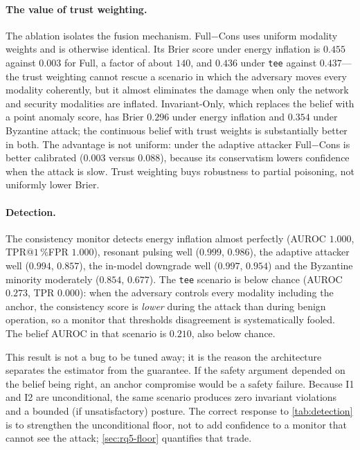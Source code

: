 \paragraph{The value of trust weighting.} The ablation isolates the fusion
mechanism. Full$-$Cons uses uniform modality weights and is otherwise identical.
Its Brier score under energy inflation is $0.455$ against $0.003$ for Full, a
factor of about $140$, and $0.436$ under \texttt{tee} against $0.437$---the trust
weighting cannot rescue a scenario in which the adversary moves every modality
coherently, but it almost eliminates the damage when only the network and
security modalities are inflated. Invariant-Only, which replaces the belief with a
point anomaly score, has Brier $0.296$ under energy inflation and $0.354$ under
Byzantine attack; the continuous belief with trust weights is substantially better
in both. The advantage is not uniform: under the adaptive attacker Full$-$Cons is
better calibrated ($0.003$ versus $0.088$), because its conservatism lowers
confidence when the attack is slow. Trust weighting buys robustness to partial
poisoning, not uniformly lower Brier.

\paragraph{Detection.} The consistency monitor detects energy inflation almost
perfectly (AUROC $1.000$, TPR@$1\,\%$FPR $1.000$), resonant pulsing well
($0.999$, $0.986$), the adaptive attacker well ($0.994$, $0.857$), the in-model
downgrade well ($0.997$, $0.954$) and the Byzantine minority moderately
($0.854$, $0.677$). The \texttt{tee} scenario is below chance (AUROC $0.273$,
TPR $0.000$): when the adversary controls every modality including the anchor,
the consistency score is \emph{lower} during the attack than during benign
operation, so a monitor that thresholds disagreement is systematically fooled.
The belief AUROC in that scenario is $0.210$, also below chance.

This result is not a bug to be tuned away; it is the reason the architecture
separates the estimator from the guarantee. If the safety argument depended on
the belief being right, an anchor compromise would be a safety failure. Because I1
and I2 are unconditional, the same scenario produces zero invariant violations and
a bounded (if unsatisfactory) posture. The correct response to
\cref{tab:detection} is to strengthen the unconditional floor, not to add
confidence to a monitor that cannot see the attack; \cref{sec:rq5-floor}
quantifies that trade.

